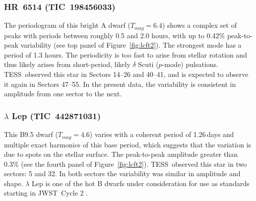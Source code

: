 \documentclass[twocolumn]{aastex631}
\newcommand{\jwst}{JWST}
\newcommand{\tess}{TESS}
\begin{document}
\subsubsection{HR~6514 (TIC~198456033)} %

The periodogram of this bright A dwarf ($T_{mag}=6.4$) shows a complex set of peaks with periods between roughly 0.5 and 2.0 hours, with up to 0.42\% peak-to-peak variability (see top panel of Figure~\ref{fig:lcft2}).  The strongest mode has a period of 1.3 hours.  The periodicity is too fast to arise from stellar rotation and thus likely arises from short-period, likely $\delta$ Scuti ($p$-mode) pulsations.  \tess\ observed this star in Sectors 14--26 and 40--41, and is expected to observe it again in Sectors 47--55.  In the present data, the variability is consistent in amplitude from one sector to the next. 


\subsubsection{$\lambda$ Lep (TIC~442871031)}

This B9.5 dwarf ($T_{mag}=4.6$) varies with a coherent period of 1.26\,days and multiple exact harmonics of this base period, which suggests that the variation is due to spots on the stellar surface. The peak-to-peak amplitude greater than 0.3\% (see the fourth panel of Figure~\ref{fig:lcft2}). \tess\ observed this star in two sectors: 5 and 32. In both sectors the variability was similar in amplitude and shape. $\lambda$ Lep is one of the hot B dwarfs under consideration for use as standards starting in \jwst\ Cycle 2 \citep{Gordon2022inprep}. 
\end{document}
